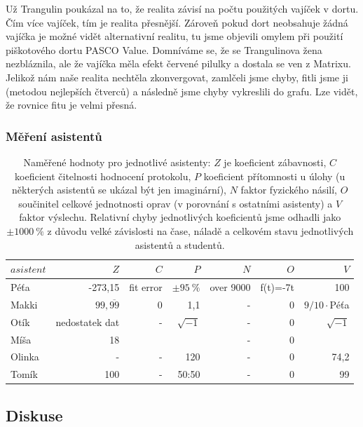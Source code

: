 \documentclass[english]{article}
\begin{document}
Už Trangulin poukázal na to, že realita závisí na počtu použitých vajíček v dortu. Čím více vajíček, tím je realita přesnější. Zároveň pokud dort neobsahuje žádná vajíčka je možné vidět alternativní realitu, tu jsme objevili omylem při použití piškotového dortu PASCO Value. Domníváme se, že se Trangulinova žena nezbláznila, ale že vajíčka měla efekt červené pilulky a dostala se ven z Matrixu.
Jelikož nám naše realita nechtěla zkonvergovat, zamlčeli jsme chyby, fitli jsme ji (metodou nejlepších čtverců) a následně jsme chyby vykreslili do grafu. Lze vidět, že rovnice fitu je velmi přesná.

\subsubsection{Měření asistentů}

\begin{table}[h!]
\centering
\begin{tabular}{|l|r|r|r|r|r|r|}
 \hline
$asistent$&$Z$&$C$&$P$&$N$&$O$&$V$ \bigstrut\\ \hline
Péťa&-273,15&fit error&$\pm 95\ \mathrm{\%}$&over 9000&f(t)=-7t&100\bigstrut\\ \hline
Makki&$99,\overline{99}$&0&1,1&-&0&$9/10\cdot$Péťa\bigstrut\\ \hline
Otík&nedostatek dat&-&$\sqrt{-1}$&-&0&$\sqrt{-1}$\bigstrut\\ \hline
Míša&18&&&-&0&\bigstrut\\ \hline
Olinka&-&-&120&-&0&74,2\bigstrut\\ \hline
Tomík&100&-&50:50&-&0&99\bigstrut\\ \hline
\end{tabular}
\caption{Naměřené hodnoty pro jednotlivé asistenty: $Z$ je koeficient zábavnosti, $C$ koeficient čitelnosti hodnocení protokolu, $P$ koeficient přítomnosti u úlohy (u některých asistentů se ukázal být jen imaginární), $N$ faktor fyzického násilí, $O$ součinitel celkové jednotnosti oprav (v porovnání s ostatními asistenty) a $V$ faktor výslechu. Relativní chyby jednotlivých koeficientů jsme odhadli jako $\pm 1000\ \mathrm{\%}$  z důvodu velké závislosti na čase, náladě a celkovém stavu jednotlivých asistentů a studentů.}
\label{tabulka}
\end{table}

\subsection{Diskuse}
\end{document}
